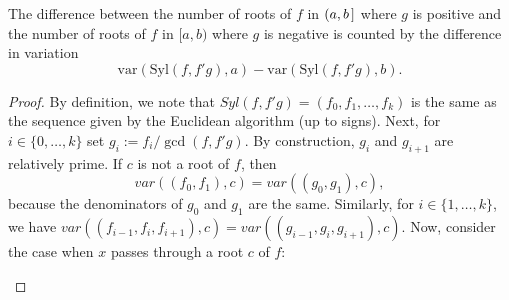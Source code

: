 \documentclass[12pt]{amsart}
\theoremstyle{definition}
\begin{document}
\theorem[Sylvester]
The difference between the number of roots of $f$ in $(a,b\hspace{.05cm}]$ where $g$ is positive and the number of roots of $f$ in $[a,b)$ where $g$ is negative is counted by the difference in variation $$\text{var}(\text{Syl}(f,f'g),a) - \text{var}(\text{Syl}(f,f'g),b).$$

\begin{proof} 


By definition, we note that $Syl(f,f'g) = (f_{0},f_{1},\dots, f_{k})$ is the same as the sequence given by the Euclidean algorithm (up to signs). Next, for $i\in\{0,\dots,k\}$ set $g_{i} := f_{i}/\gcd(f,f'g)$. By construction, $g_{i}$ and $g_{i+1}$ are relatively prime. If $c$ is not a root of $f$, then $$var\left((f_{0},f_{1}),c\right) = var\left((g_{0},g_{1}),c\right),$$ because the denominators of $g_{0}$ and $g_{1}$ are the same. Similarly, for $i\in\{1,\dots,k\}$, we have $var\left((f_{i-1},f_{i},f_{i+1}),c\right) = var\left((g_{i-1},g_{i},g_{i+1}),c\right)$. Now, consider the case when $x$ passes through a root $c$ of $f$:

\begin{table}[h]
\begin{subtable}{.3\linewidth}
\end{subtable}%
\begin{subtable}{.3\linewidth}
\end{subtable}
\end{table}


\end{proof}
\end{document}
